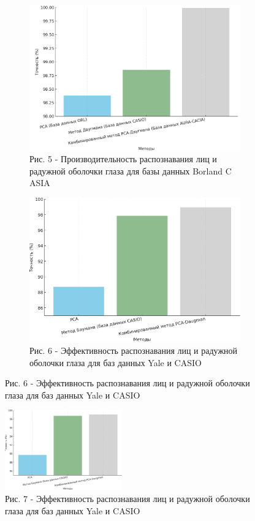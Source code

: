 \begin{figure}[H]
    \centering
    \begin{subfigure}[b]{0.45\textwidth}
        \centering
        \includegraphics[width=\textwidth]{assets/87}
		\caption*{Рис. 5 - Производительность распознавания лиц и радужной оболочки глаза для базы данных Borland C ASIA}
    \end{subfigure}
    \hfill
    \begin{subfigure}[b]{0.45\textwidth}
        \centering
        \includegraphics[width=\textwidth]{assets/88}
		\caption*{Рис. 6 - Эффективность распознавания лиц и радужной оболочки глаза для баз данных Yale и CASIO}
    \end{subfigure}
\end{figure}

\begin{figure}[H]
	\centering
	\includegraphics[width=0.45\textwidth]{assets/89}
	\caption*{Рис. 7 - Эффективность распознавания лиц и радужной оболочки глаза для баз данных Yale и CASIO}
\end{figure}

